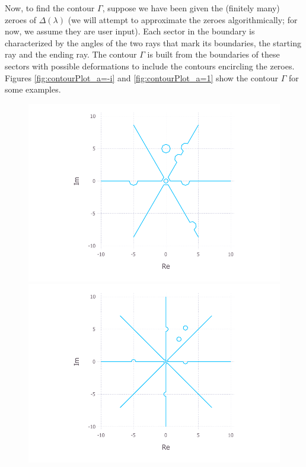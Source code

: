 \documentclass[11pt, oneside, a4paper]{article}
\begin{document}
Now, to find the contour $\Gamma$, suppose we have been given the (finitely many) zeroes of $\Delta(\lambda)$ (we will attempt to approximate the zeroes algorithmically; for now, we assume they are user input). Each sector in the boundary is characterized by the angles of the two rays that mark its boundaries, the starting ray and the ending ray. The contour $\Gamma$ is built from the boundaries of these sectors with possible deformations to include the contours encircling the zeroes. Figures \ref{fig:contourPlot_a=-i} and \ref{fig:contourPlot_a=1} show the contour $\Gamma$ for some examples.
\begin{figure}[htpb!]
      \includegraphics[width=\linewidth]{contourPlot_a=-i_n=3.pdf}
    \endminipage\hfill
      \includegraphics[width=\linewidth]{contourPlot_a=-i_n=4.pdf}

\end{figure}
\end{document}
